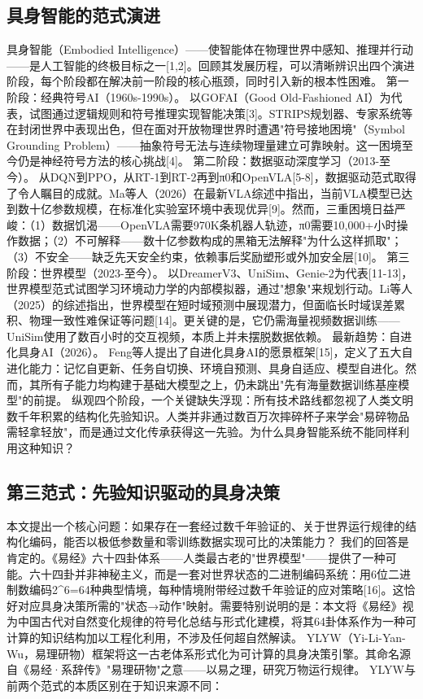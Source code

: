 \documentclass[12pt,a4paper]{article}
\begin{document}
\subsection{具身智能的范式演进}
具身智能（Embodied Intelligence）——使智能体在物理世界中感知、推理并行动——是人工智能的终极目标之一[1,2]。回顾其发展历程，可以清晰辨识出四个演进阶段，每个阶段都在解决前一阶段的核心瓶颈，同时引入新的根本性困难。
第一阶段：经典符号AI（1960s-1990s）。 以GOFAI（Good Old-Fashioned AI）为代表，试图通过逻辑规则和符号推理实现智能决策[3]。STRIPS规划器、专家系统等在封闭世界中表现出色，但在面对开放物理世界时遭遇"符号接地困境"（Symbol Grounding Problem）——抽象符号无法与连续物理量建立可靠映射。这一困境至今仍是神经符号方法的核心挑战[4]。
第二阶段：数据驱动深度学习（2013-至今）。 从DQN到PPO，从RT-1到RT-2再到π0和OpenVLA[5-8]，数据驱动范式取得了令人瞩目的成就。Ma等人（2026）在最新VLA综述中指出，当前VLA模型已达到数十亿参数规模，在标准化实验室环境中表现优异[9]。然而，三重困境日益严峻：（1）数据饥渴——OpenVLA需要970K条机器人轨迹，π0需要10,000+小时操作数据；（2）不可解释——数十亿参数构成的黑箱无法解释"为什么这样抓取"；（3）不安全——缺乏先天安全约束，依赖事后奖励塑形或外加安全层[10]。
第三阶段：世界模型（2023-至今）。 以DreamerV3、UniSim、Genie-2为代表[11-13]，世界模型范式试图学习环境动力学的内部模拟器，通过"想象"来规划行动。Li等人（2025）的综述指出，世界模型在短时域预测中展现潜力，但面临长时域误差累积、物理一致性难保证等问题[14]。更关键的是，它仍需海量视频数据训练——UniSim使用了数百小时的交互视频，本质上并未摆脱数据依赖。
最新趋势：自进化具身AI（2026）。 Feng等人提出了自进化具身AI的愿景框架[15]，定义了五大自进化能力：记忆自更新、任务自切换、环境自预测、具身自适应、模型自进化。然而，其所有子能力均构建于基础大模型之上，仍未跳出"先有海量数据训练基座模型"的前提。
纵观四个阶段，一个关键缺失浮现：所有技术路线都忽视了人类文明数千年积累的结构化先验知识。人类并非通过数百万次摔碎杯子来学会"易碎物品需轻拿轻放"，而是通过文化传承获得这一先验。为什么具身智能系统不能同样利用这种知识？

\subsection{第三范式：先验知识驱动的具身决策}
本文提出一个核心问题：如果存在一套经过数千年验证的、关于世界运行规律的结构化编码，能否以极低参数量和零训练数据实现可比的决策能力？
我们的回答是肯定的。《易经》六十四卦体系——人类最古老的"世界模型"——提供了一种可能。六十四卦并非神秘主义，而是一套对世界状态的二进制编码系统：用6位二进制数编码2^6=64种典型情境，每种情境附带经过数千年验证的应对策略[16]。这恰好对应具身决策所需的"状态→动作"映射。需要特别说明的是：本文将《易经》视为中国古代对自然变化规律的符号化总结与形式化建模，将其64卦体系作为一种可计算的知识结构加以工程化利用，不涉及任何超自然解读。
YLYW（Yi-Li-Yan-Wu，易理研物）框架将这一古老体系形式化为可计算的具身决策引擎。其命名源自《易经·系辞传》"易理研物"之意——以易之理，研究万物运行规律。
YLYW与前两个范式的本质区别在于知识来源不同：
\end{document}
